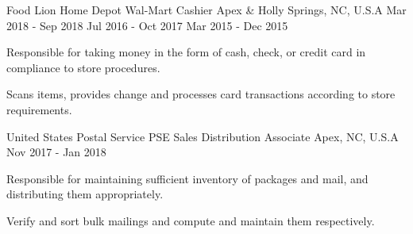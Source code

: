 \vspace{-.3\baselineskip}

\begin{cventries}
  \cventry
    {
    {Food Lion}
    {\newline}
    \vspace{-.25\baselineskip}
    {Home Depot}
    \vspace{-.5\baselineskip}
    {\newline}
    {Wal-Mart}
    } %
    {Cashier \vspace{-.4\baselineskip}} %
    {Apex \& Holly Springs, NC, U.S.A \vspace{-.4\baselineskip}} %
    {
    {Mar 2018 - Sep 2018}
    {\newline}
    \vspace{-.25\baselineskip}
    {Jul 2016 - Oct 2017}
    \vspace{-.5\baselineskip}
    {\newline}
    {Mar 2015 - Dec 2015}
    }%
    {
      \begin{cvitems} %
        \item {Responsible for taking money in the form of cash, check, or credit card in compliance to store procedures.}
        \item {Scans items, provides change and processes card transactions according to store requirements.}
      \end{cvitems}
    }

  \cventry
    {United States Postal Service
    } %
    {PSE Sales Distribution Associate} %
    {Apex, NC, U.S.A} %
    {Nov 2017 - Jan 2018} %
    {
      \begin{cvitems} %
        \item {Responsible for maintaining sufficient inventory of packages and mail, and distributing them appropriately.}
        \item {Verify and sort bulk mailings and compute and maintain them respectively.}
      \end{cvitems}
    }


\end{cventries}
